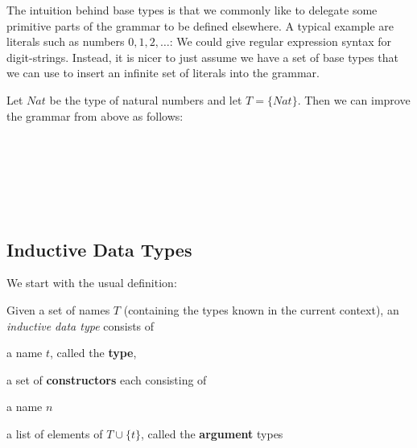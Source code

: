 The intuition behind base types is that we commonly like to delegate some primitive parts of the grammar to be defined elsewhere.
A typical example are literals such as numbers $0, 1, 2,\ldots$: We could give regular expression syntax for digit-strings.
Instead, it is nicer to just assume we have a set of base types that we can use to insert an infinite set of literals into the grammar.

\begin{example}
Let $Nat$ be the type of natural numbers and let $T=\{Nat\}$.
Then we can improve the grammar from above as follows:
\begin{commgrammar}
\\
\\
\\
\\
\\
\end{commgrammar}
\end{example}

\subsection{Inductive Data Types}\label{sec:idt}

We start with the usual definition:

\begin{definition}\label{def:idt}
Given a set of names $T$ (containing the types known in the current context), an \emph{inductive data type} consists of
\begin{compactitem}
 \item a name $t$, called the \textbf{type},
 \item a set of \textbf{constructors} each consisting of
 \begin{compactitem}
  \item a name $n$
  \item a list of elements of $T\cup\{t\}$, called the \textbf{argument} types
 \end{compactitem} 
\end{compactitem}
\end{definition}

\newcommand{\cons}[2]{\mathtt{#1}\,\kw{of}\,\fold{*}{#2}}
\newcommand{\indtype}[2]{#1\,=\,\fold{\;\tb|\tb}{#2}}
\newcommand{\consnot}[3]{\mathtt{#1}\,\kw{of}\,\fold{*}{#2}\,\#\,#3}
\newcommand{\consn}[2]{\mathtt{#1}\,\#\,#2}

